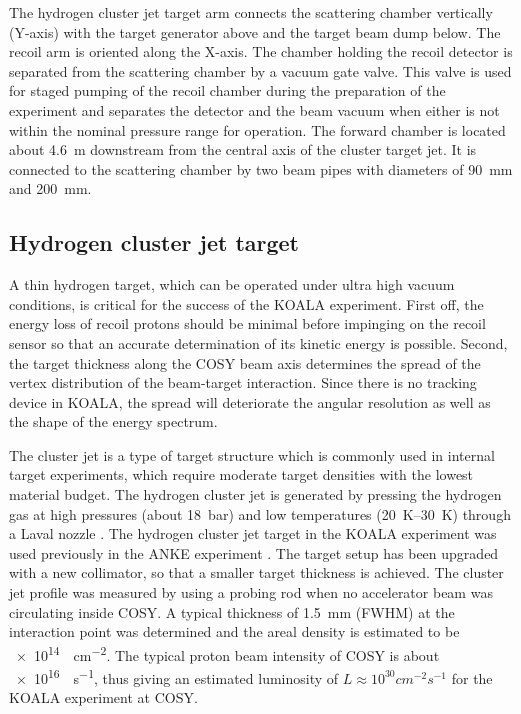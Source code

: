 \documentclass[number,5p]{elsarticle}
\begin{document}
The hydrogen cluster jet target arm connects the scattering chamber vertically (Y-axis) with the target generator above and the target beam dump below.
The recoil arm is oriented along the X-axis.
The chamber holding the recoil detector is separated from the scattering chamber by a vacuum gate valve.
This valve is used for staged pumping of the recoil chamber during the
preparation of the experiment and separates the detector and the beam vacuum when
either is not within the nominal pressure range for operation.
The forward chamber is located about \SI{4.6}{\meter} downstream from the
central axis of the cluster target jet.
It is connected to the scattering chamber by two beam pipes with diameters of \SI{90}{\mm} and \SI{200}{\mm}.
\subsection{Hydrogen cluster jet target}
\label{sec:target}

A thin hydrogen target, which can be operated under ultra high vacuum
conditions, is critical for the success of the KOALA experiment.
First off, the energy loss of recoil protons should be minimal before impinging
on the recoil sensor so that an accurate determination of its kinetic energy is possible.
Second, the target thickness along the COSY beam axis determines
the spread of the vertex distribution of the beam-target interaction.
Since there is no tracking device in KOALA, the spread will deteriorate the
angular resolution as well as the shape of the energy spectrum.

The cluster jet is a type of target structure
which is commonly used in internal target experiments, which require moderate
target densities with the lowest material budget.
The hydrogen cluster jet is generated by pressing the hydrogen gas at high
pressures (about \SI{18}{\bar}) and low temperatures (\SIrange{20}{30}{\K})
through a Laval nozzle \cite{cluster_target}. 
The hydrogen cluster jet target in the KOALA experiment was used previously in the ANKE experiment
\cite{cluster_target_new}.
The target setup has been upgraded with a new collimator, so that a smaller target thickness is achieved.
The cluster jet profile was measured by using a probing rod when no accelerator beam was circulating inside COSY.
A typical thickness of \SI{1.5}{\mm} (FWHM) at the interaction point was determined
and the areal density is estimated to be \SI{e14}{\atom\per\cm\squared}.
The typical proton beam intensity of COSY is about
\SI{e16}{\atom\per\second}, thus giving an estimated luminosity of $L
\approx 10^{30}\si{cm^{-2}s^{-1}}$ for the KOALA experiment at COSY.
\end{document}
